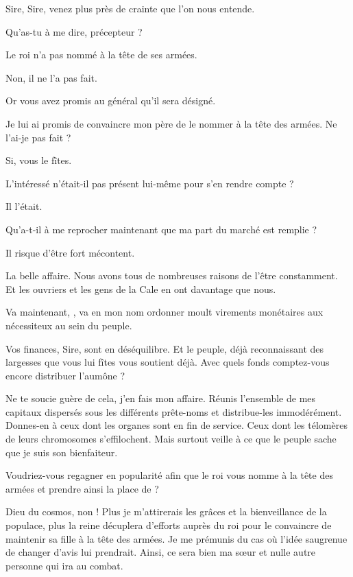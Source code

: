 \begin{drama}
  \alexasspeaks Sire, Sire, venez plus près de crainte que l’on nous entende.

  \elenaspeaks Qu’as-tu à me dire, précepteur ?

  \alexasspeaks Le roi n’a pas nommé \general à la tête de ses armées.

  \elenaspeaks Non, il ne l’a pas fait.

  \alexasspeaks Or vous avez promis au général qu’il sera désigné.

  \elenaspeaks Je lui ai promis de convaincre mon père de le nommer à la tête des armées. Ne l’ai-je pas fait ?

  \alexasspeaks Si, vous le fîtes.

  \elenaspeaks L’intéressé n’était-il pas présent lui-même pour s’en rendre compte ?

  \alexasspeaks Il l’était.

  \elenaspeaks Qu’a-t-il à me reprocher maintenant que ma part du marché est remplie ?

  \alexasspeaks Il risque d’être fort mécontent.

  \elenaspeaks La belle affaire. Nous avons tous de nombreuses raisons de l’être constamment. Et les ouvriers et les gens de la Cale en ont davantage que nous.

  Va maintenant, \alexas, va en mon nom ordonner moult virements monétaires aux nécessiteux au sein du peuple.

  \alexasspeaks Vos finances, Sire, sont en déséquilibre. Et le peuple, déjà reconnaissant des largesses que vous lui fîtes vous soutient déjà. Avec quels fonds comptez-vous encore distribuer l’aumône ?

  \elenaspeaks Ne te soucie guère de cela, j’en fais mon affaire. Réunis l’ensemble de mes capitaux dispersés sous les différents prête-noms et distribue-les immodérément. 
  Donnes-en à ceux dont les organes sont en fin de service. Ceux dont les télomères de leurs chromosomes s’effilochent. Mais surtout veille à ce que le peuple sache que je suis son bienfaiteur.

  \alexasspeaks Voudriez-vous regagner en popularité afin que le roi vous nomme à la tête des armées et prendre ainsi la place de \general ?

  \elenaspeaks Dieu du cosmos, non ! Plus je m’attirerais les grâces et la bienveillance de la populace, plus la reine décuplera d’efforts auprès du roi pour le convaincre de maintenir sa fille à la tête des armées. Je me prémunis du cas où  l’idée saugrenue de changer d’avis lui prendrait. Ainsi, ce sera bien ma sœur et nulle autre personne qui ira au combat.


\end{drama}
